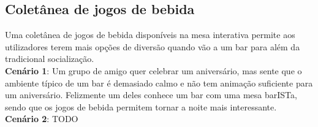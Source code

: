 \documentclass{article}
\begin{document}
\subsection{Coletânea de jogos de bebida}
Uma coletânea de jogos de bebida disponíveis na mesa interativa permite aos utilizadores terem mais opções de diversão quando vão a um bar para além da tradicional socialização.\\
\textbf{Cenário 1}: Um grupo de amigo quer celebrar um aniversário, mas sente que o ambiente típico de um bar é demasiado calmo e não tem animação suficiente para um aniversário. Felizmente um deles conhece um bar com uma mesa barISTa, sendo que os jogos de bebida permitem tornar a noite mais interessante.\\
\textbf{Cenário 2}: TODO
\end{document}
